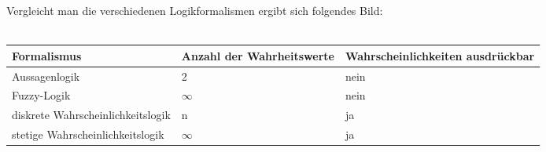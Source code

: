 Vergleicht man die verschiedenen Logikformalismen ergibt sich folgendes Bild:\\\\

\begin{tabular}{ l p{4cm} p{4cm} }
  Formalismus & Anzahl der Wahrheitswerte & Wahrscheinlichkeiten ausdrückbar\\
  \hline
  Aussagenlogik & 2 & nein \\
  Fuzzy-Logik & $\infty$ & nein \\
  diskrete Wahrscheinlichkeitslogik & n & ja\\
  stetige Wahrscheinlichkeitslogik & $\infty$ & ja\\
\end{tabular}